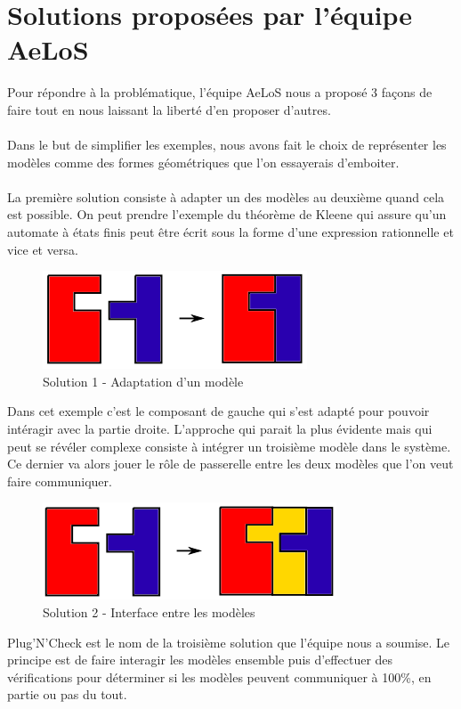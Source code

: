 \documentclass[12pt,a4paper]{report}
\begin{document}
\section{Solutions proposées par l'équipe AeLoS}\label{sec:Solutions}
Pour répondre à la problématique, l'équipe AeLoS nous a proposé 3 façons de 
faire tout en nous laissant la liberté d'en proposer d'autres.
\\\\
Dans le but de simplifier les exemples, nous avons fait le choix de représenter 
les modèles comme des formes géométriques que l'on essayerais d'emboiter.
\\\\
La première solution consiste à adapter un des modèles au deuxième quand cela 
est possible. On peut prendre l'exemple du théorème de Kleene qui assure qu'un 
automate à états finis peut être écrit sous la forme d'une expression 
rationnelle et vice et versa.

\begin{figure}[h]
	\centering
	\includegraphics[scale=1]{ressources/solution1.png}
	\caption{Solution 1 - Adaptation d'un modèle}
\end{figure}

Dans cet exemple c'est le composant de gauche qui s'est adapté pour pouvoir intéragir
avec la partie droite.
\newpage
L'approche qui parait la plus évidente mais qui peut se révéler complexe 
consiste à intégrer un troisième modèle dans le système. Ce dernier va alors 
jouer le rôle de passerelle entre les deux modèles que l'on veut faire 
communiquer.

\begin{figure}[h]
	\centering
	\includegraphics[scale=1]{ressources/solution2.png}
	\caption{Solution 2 - Interface entre les modèles}
\end{figure}

Plug'N'Check est le nom de la troisième solution que l'équipe nous a soumise. 
Le principe est de faire interagir les modèles ensemble puis d'effectuer des 
vérifications pour déterminer si les modèles peuvent communiquer à 100\%, 
en partie ou pas du tout.
\end{document}
